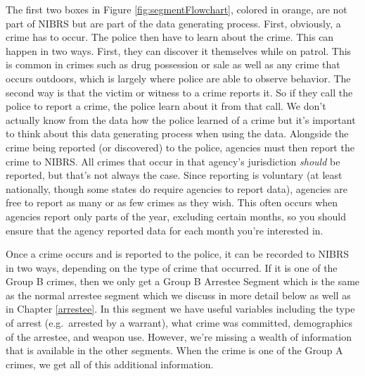 \documentclass[
  12pt,
  openany]{book}
\begin{document}
The first two boxes in Figure \ref{fig:segmentFlowchart}, colored in orange, are not part of NIBRS but are part of the data generating process. First, obviously, a crime has to occur. The police then have to learn about the crime. This can happen in two ways. First, they can discover it themselves while on patrol. This is common in crimes such as drug possession or sale as well as any crime that occurs outdoors, which is largely where police are able to observe behavior. The second way is that the victim or witness to a crime reports it. So if they call the police to report a crime, the police learn about it from that call. We don't actually know from the data how the police learned of a crime but it's important to think about this data generating process when using the data.
Alongside the crime being reported (or discovered) to the police, agencies must then report the crime to NIBRS. All crimes that occur in that agency's jurisdiction \emph{should} be reported, but that's not always the case. Since reporting is voluntary (at least nationally, though some states do require agencies to report data), agencies are free to report as many or as few crimes as they wish. This often occurs when agencies report only parts of the year, excluding certain months, so you should ensure that the agency reported data for each month you're interested in.

Once a crime occurs and is reported to the police, it can be recorded to NIBRS in two ways, depending on the type of crime that occurred. If it is one of the Group B crimes, then we only get a Group B Arrestee Segment which is the same as the normal arrestee segment which we discuss in more detail below as well as in Chapter \ref{arrestee}. In this segment we have useful variables including the type of arrest (e.g.~arrested by a warrant), what crime was committed, demographics of the arrestee, and weapon use. However, we're missing a wealth of information that is available in the other segments. When the crime is one of the Group A crimes, we get all of this additional information.
\end{document}
